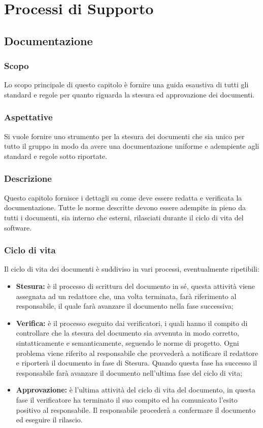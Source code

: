 \section{Processi di Supporto}

	\subsection{Documentazione}

		\subsubsection{Scopo}
			Lo scopo principale di questo capitolo è fornire una guida esaustiva di tutti gli standard e regole per quanto riguarda la stesura ed approvazione dei documenti.
		\subsubsection{Aspettative}
			Si vuole fornire uno strumento per la stesura dei documenti che sia unico per tutto il gruppo in modo da avere una documentazione uniforme e adempiente agli standard e regole sotto riportate.
		\subsubsection{Descrizione}
			Questo capitolo fornisce i dettagli su come deve essere redatta e verificata la documentazione. Tutte le norme descritte devono essere adempite in pieno da tutti i documenti, sia interno che esterni, rilasciati durante il ciclo di vita del software.
		\subsubsection{Ciclo di vita}
			Il ciclo di vita dei documenti è suddiviso in vari processi, eventualmente ripetibili:
			\begin{itemize}
				\item \textbf{Stesura:} è il processo di scrittura del documento in sé, questa attività viene assegnata ad un redattore che, una volta terminata, farà riferimento al responsabile, il quale farà avanzare il documento nella fase successiva;
				\item \textbf{Verifica:} è il processo eseguito dai verificatori, i quali hanno il compito di controllare che la stesura del documento sia avvenuta in modo corretto, sintatticamente e semanticamente, seguendo le norme di progetto. Ogni problema viene riferito al responsabile che provvederà a notificare il redattore e riporterà il documento in fase di Stesura. Quando questa fase ha successo il responsabile farà avanzare il documento nell'ultima fase del ciclo di vita;
				\item \textbf{Approvazione:} è l'ultima attività del ciclo di vita del documento, in questa fase il verificatore ha terminato il suo compito ed ha comunicato l'esito positivo al responsabile. Il responsabile procederà a confermare il documento ed eseguire il rilascio.
			\end{itemize}
